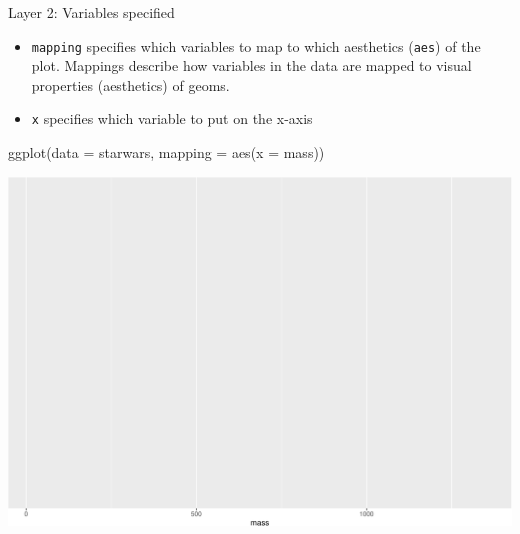 \documentclass[
  ignorenonframetext,
]{beamer}
\newenvironment{Shaded}{\begin{snugshade}}{\end{snugshade}}
\newcommand{\AttributeTok}[1]{\textcolor[rgb]{0.40,0.45,0.13}{#1}}
\newcommand{\FunctionTok}[1]{\textcolor[rgb]{0.28,0.35,0.67}{#1}}
\newcommand{\NormalTok}[1]{\textcolor[rgb]{0.00,0.23,0.31}{#1}}
\begin{document}
\begin{frame}[fragile]
Layer 2: Variables specified

\begin{itemize}
\item
  \texttt{mapping} specifies which variables to map to which aesthetics
  (\texttt{aes}) of the plot. Mappings describe how variables in the
  data are mapped to visual properties (aesthetics) of geoms.
\item
  \texttt{x} specifies which variable to put on the x-axis
\end{itemize}

\begin{Shaded}
\begin{Highlighting}[]
\FunctionTok{ggplot}\NormalTok{(}\AttributeTok{data =}\NormalTok{ starwars, }\AttributeTok{mapping =} \FunctionTok{aes}\NormalTok{(}\AttributeTok{x =}\NormalTok{ mass))}
\end{Highlighting}
\end{Shaded}

\includegraphics{GQ_DataViz_Day1_files/figure-beamer/unnamed-chunk-8-1.pdf}
\end{frame}
\end{document}
